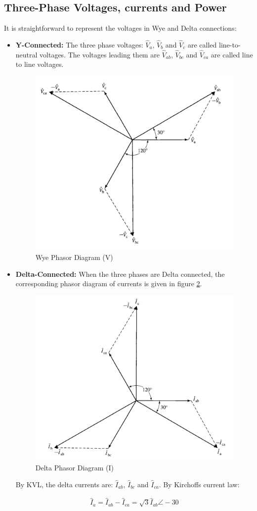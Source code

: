 \documentclass{book}
\begin{document}
\subsection{Three-Phase Voltages, currents and Power}

It is straightforward to represent the voltages in Wye and Delta connections:

\begin{itemize}
	\item \textbf{Y-Connected:} The three phase voltages: $\hat{V}_a$, $\hat{V}_b$ and $\hat{V}_c$ are called line-to-neutral voltages. The voltages leading them are $\hat{V}_{ab}$, $\hat{V}_{bc}$ and $\hat{V}_{ca}$ are called line to line voltages.
	\begin{figure}[h]
		\centering
		\includegraphics[width=0.4\linewidth]{Screenshots/wye_phasor}
		\caption{Wye Phasor Diagram (V)}
		\label{fig:wyephasor}
	\end{figure}
	\item \textbf{Delta-Connected:} When the three phases are Delta connected, the corresponding phasor diagram of currents is given in figure \ref{fig:deltaphasor}.
	\begin{figure}[h]
		\centering
		\includegraphics[width=0.4\linewidth]{Screenshots/delta_phasor}
		\caption{Delta Phasor Diagram (I)}
		\label{fig:deltaphasor}
	\end{figure}
	
	By KVL, the delta currents are: $\hat{I}_{ab}$, $\hat{I}_{bc}$ and $\hat{I}_{ca}$. By Kirchoffs current law:
	
	\begin{align*}
		\hat{I}_a = \hat{I}_{ab} - \hat{I}_{ca} = \sqrt{3}\hat{I}_{ab} \angle-30
	\end{align*}
	
\end{itemize}
\end{document}
